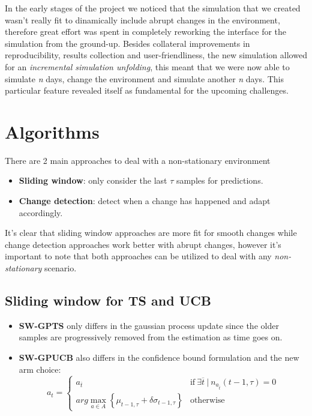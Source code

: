 In the early stages of the project we noticed that the simulation that we created wasn't really fit to dinamically include abrupt changes in the environment, therefore great effort was spent in completely reworking the interface for the simulation from the ground-up.
Besides collateral improvements in reproducibility, results collection and user-friendliness, the new simulation allowed for an \textit{incremental simulation unfolding}, this meant that we were now able to simulate \textit{n} days, change the environment and simulate another \textit{n} days.
This particular feature revealed itself as fundamental for the upcoming challenges.

\section{Algorithms}
\label{sec:ns_demand_alg}

There are 2 main approaches to deal with a non-stationary environment

\begin{itemize}
    \item \textbf{Sliding window}: only consider the last $\tau$ samples for predictions.
    \item \textbf{Change detection}: detect when a change has happened and adapt accordingly.
\end{itemize}

It's clear that sliding window approaches are more fit for smooth changes while change detection approaches work better with abrupt changes, however it's important to note that both approaches can be utilized to deal with any \textit{non-stationary} scenario.

\subsection{Sliding window for TS and UCB}

\begin{itemize}
    \item \textbf{SW-GPTS} only differs in the gaussian process update since the older samples are progressively removed from the estimation as time goes on.
    \item \textbf{SW-GPUCB} also differs in the confidence bound formulation and the new arm choice:
        \begin{displaymath}
            a_t =
            \begin{cases}
                a_{\overline{t}} & \text{if} ~ \exists \overline{t} ~ | ~ n_{a_{\overline{t}}}(t-1, \tau) = 0 \\
                arg\max_{a \in A} \left\{ \mu_{t-1, \tau} + \delta \sigma_{t-1, \tau} \right\} & \text{otherwise}
            \end{cases}
        \end{displaymath}
\end{itemize}

